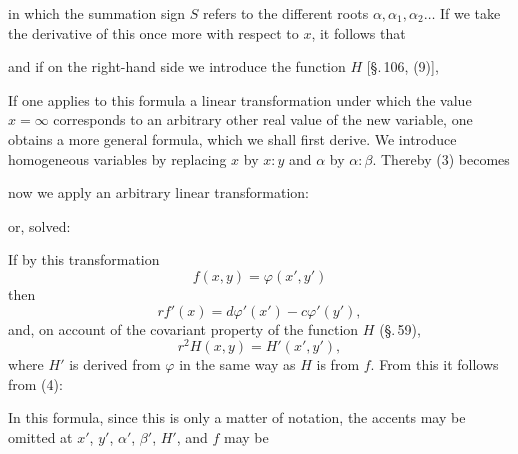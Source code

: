 

in which the summation sign $S$ refers to the different roots
$\alpha, \alpha_1, \alpha_2 \dots$ If we take the derivative of this once more
with respect to $x$, it follows that


and if on the right-hand side we introduce the function $H$ [\S.\,106, (9)],


If one applies to this formula a linear transformation under which
the value $x = \infty$ corresponds to an arbitrary other real value of the new
variable, one obtains a more general formula,
which we shall first derive. We introduce homogeneous variables
by replacing $x$ by $x:y$ and $\alpha$ by $\alpha:\beta$.
Thereby (3) becomes


now we apply an arbitrary linear transformation:


or, solved:


If by this transformation
\[
f(x,y) = \varphi(x', y')
\]
then
\[
rf'(x) = d\varphi'(x') - c\varphi'(y'),
\]
and, on account of the covariant property of the function $H$ (\S.\,59),
\[
r^2 H(x,y) = H'(x', y'),
\]
where $H'$ is derived from $\varphi$ in the same way as $H$ is from $f$. From this
it follows from (4):


In this formula, since this is only a matter of notation, the accents
may be omitted at $x'$, $y'$, $\alpha'$, $\beta'$, $H'$, and $f$ may be

